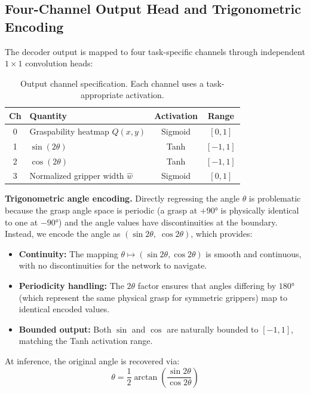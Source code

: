 \documentclass[12pt, a4paper]{article}
\begin{document}
\subsection{Four-Channel Output Head and Trigonometric Encoding}

The decoder output is mapped to four task-specific channels through independent $1 \times 1$ convolution heads:

\begin{table}[H]
\centering
\caption{Output channel specification. Each channel uses a task-appropriate activation.}
\label{tab:output}
\begin{tabular}{@{}clcc@{}}
\toprule
\textbf{Ch} & \textbf{Quantity} & \textbf{Activation} & \textbf{Range} \\
\midrule
0 & Graspability heatmap $Q(x,y)$   & Sigmoid & $[0, 1]$ \\
1 & $\sin(2\theta)$                 & Tanh    & $[-1, 1]$ \\
2 & $\cos(2\theta)$                 & Tanh    & $[-1, 1]$ \\
3 & Normalized gripper width $\hat{w}$ & Sigmoid & $[0, 1]$ \\
\bottomrule
\end{tabular}
\end{table}

\textbf{Trigonometric angle encoding.}
Directly regressing the angle $\theta$ is problematic because the grasp angle space is periodic (a grasp at $+90°$ is physically identical to one at $-90°$) and the angle values have discontinuities at the boundary. Instead, we encode the angle as $(\sin 2\theta,\; \cos 2\theta)$, which provides:

\begin{itemize}[leftmargin=2em]
    \item \textbf{Continuity:} The mapping $\theta \mapsto (\sin 2\theta, \cos 2\theta)$ is smooth and continuous, with no discontinuities for the network to navigate.
    \item \textbf{Periodicity handling:} The $2\theta$ factor ensures that angles differing by $180°$ (which represent the same physical grasp for symmetric grippers) map to identical encoded values.
    \item \textbf{Bounded output:} Both $\sin$ and $\cos$ are naturally bounded to $[-1, 1]$, matching the Tanh activation range.
\end{itemize}

At inference, the original angle is recovered via:
\begin{equation}
    \theta = \frac{1}{2} \arctan\!\left(\frac{\sin 2\theta}{\cos 2\theta}\right)
\end{equation}
\end{document}
